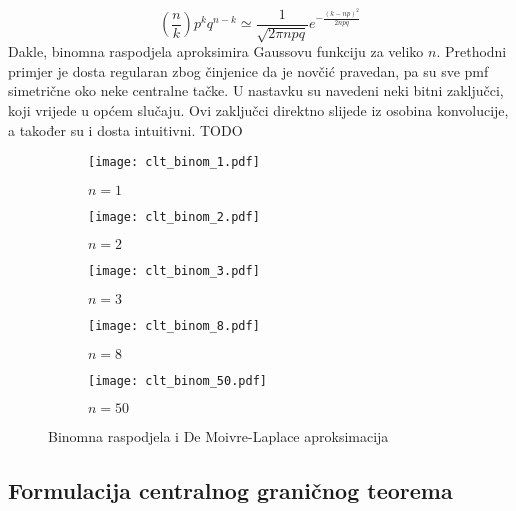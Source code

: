 \begin{equation}
  \left(\frac{n}{k}\right) p^kq^{n-k} \simeq \frac{1}{\sqrt{2\pi npq}}
  e^{-\frac{(k-np)^2}{2npq}}
\end{equation}
Dakle, binomna raspodjela aproksimira Gaussovu funkciju za veliko $n$.
Prethodni primjer je dosta regularan zbog činjenice da je novčić pravedan, pa su
sve pmf simetrične oko neke centralne tačke. U nastavku su navedeni neki bitni
zaključci, koji vrijede u općem slučaju. Ovi zaključci direktno slijede iz
osobina konvolucije, a također su i dosta intuitivni.
TODO

\begin{figure}[H]
  \centering
  \begin{subfigure}[b]{0.3\textwidth}
    \centering
    \texttt{[image: clt\_binom\_1.pdf]}
    \caption{$n=1$}
    \label{fig:binom:a}
  \end{subfigure}
  \vspace{10pt}
	\begin{subfigure}[b]{0.3\textwidth}
		\centering
    \texttt{[image: clt\_binom\_2.pdf]}
    \caption{$n=2$}
    \label{fig:binom:b}
	\end{subfigure}
	\begin{subfigure}[b]{0.3\textwidth}
		\centering
    \texttt{[image: clt\_binom\_3.pdf]}
    \caption{$n=3$}
    \label{fig:binom:c}
	\end{subfigure}
	\begin{subfigure}[b]{0.3\textwidth}
		\centering
    \texttt{[image: clt\_binom\_8.pdf]}
    \caption{$n=8$}
    \label{fig:binom:d}
	\end{subfigure}
	\begin{subfigure}[b]{0.3\textwidth}
		\centering
    \texttt{[image: clt\_binom\_50.pdf]}
    \caption{$n=50$}
    \label{fig:binom:e}
	\end{subfigure}
	\caption{Binomna raspodjela i De Moivre-Laplace aproksimacija}
  \label{fig:binom}
\end{figure}

\subsection{Formulacija centralnog graničnog teorema}

